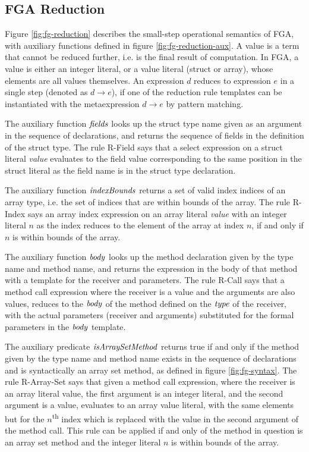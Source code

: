 

\subsection{FGA Reduction}

Figure \ref{fig:fg-reduction} describes the small-step operational semantics of
FGA, with auxiliary functions defined in figure \ref{fig:fg-reduction-aux}. A
value is a term that cannot be reduced further, i.e. is the final result of
computation. In FGA, a value is either an integer literal, or a value literal
(struct or array), whose elements are all values themselves. An expression $d$
reduces to expression $e$ in a single step (denoted as $d \to e$), if one of the
reduction rule templates can be instantiated with the metaexpression $d \to e$
by pattern matching.

The auxiliary function $\mathit{fields}$ looks up the struct type name given as an
argument in the sequence of declarations, and returns the sequence of fields in
the definition of the struct type. The rule R-Field says that a select
expression on a struct literal \emph{value} evaluates to the field value
corresponding to the same position in the struct literal as the field name is in
the struct type declaration.

The auxiliary function $\mathit{indexBounds}$ returns a set of valid index indices of an
array type, i.e. the set of indices that are within bounds of the array. The
rule R-Index says an array index expression on an array literal \emph{value}
with an integer literal $n$ as the index reduces to the element of the array at
index $n$, if and only if $n$ is within bounds of the array.

The auxiliary function $\mathit{body}$ looks up the method declaration given by the
type name and method name, and returns the expression in the body of that method
with a template for the receiver and parameters. The rule R-Call says that a
method call expression where the receiver is a value and the arguments are also
values, reduces to the $\mathit{body}$ of the method defined on the $\mathit{type}$ of the
receiver, with the actual parameters (receiver and arguments) substituted for
the formal parameters in the $\mathit{body}$ template.

The auxiliary predicate $\mathit{isArraySetMethod}$ returns true if and only if the
method given by the type name and method name exists in the sequence of
declarations and is syntactically an array set method, as defined in figure
\ref{fig:fg-syntax}. The rule R-Array-Set says that given a method call
expression, where the receiver is an array literal value, the first argument is
an integer literal, and the second argument is a value, evaluates to an array
value literal, with the same elements but for the $n$\textsuperscript{th} index
which is replaced with the value in the second argument of the method call. This
rule can be applied if and only of the method in question is an array set method
and the integer literal $n$ is within bounds of the array.

